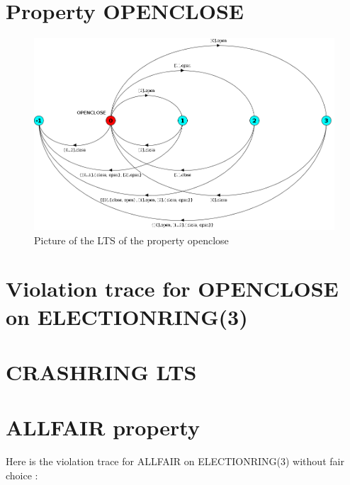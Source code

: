 \documentclass{article}
\begin{document}
\section{Property OPENCLOSE}
\begin{figure}[h!]
  \centering
    \includegraphics[width=\textwidth]{openclose_lts.png}
    \caption{Picture of the LTS of the property openclose}
\end{figure}

\section{Violation trace for OPENCLOSE on ELECTIONRING(3)}



\section{CRASHRING LTS}


\section{ALLFAIR property}

Here is the violation trace for ALLFAIR on ELECTIONRING(3) without fair choice :
\end{document}
